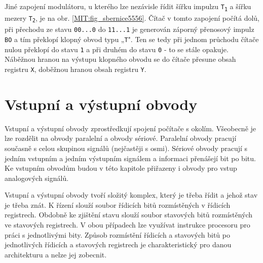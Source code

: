     Jiné zapojení modulátoru, u kterého lze nezávisle řídit šířku impulzu 
    \texttt{T\textsubscript{1}} a šířku mezery \texttt{T\textsubscript{2}}, je na obr. 
    \ref{MIT:fig_sbernice5556}. Čítač v tomto zapojení počítá dolů, při přechodu ze stavu 
    \texttt{00...0} do \texttt{11...1} je generován záporný přenosový impulz \texttt{BO} a tím 
    překlopí klopný obvod typu „\texttt{T}". Ten se tedy při jednom průchodu čítače nulou 
    překlopí do stavu \texttt{1} a při druhém do stavu \texttt{0} - to se stále opakuje. Náběžnou 
    hranou na výstupu klopného obvodu se do čítače přesune obsah registru \texttt{X}, doběžnou 
    hranou obsah registru \texttt{Y}.
        
  \section{Vstupní a výstupní obvody}\label{ces:IchapIVsecVIII}
    Vstupní a výstupní obvody zprostředkují spojení počítače s okolím. Všeobecně je lze rozdělit na 
    obvody paralelní a obvody sériové. Paralelní obvody pracují současně s celou skupinou signálů 
    (nejčastěji s osmi). Sériové obvody pracují s jedním vstupním a jedním výstupním signálem a 
    informaci přenášejí bit po bitu. Ke vstupním obvodům budou v této kapitole přiřazeny i obvody 
    pro vstup analogových signálů.
    
    Vstupní a výstupní obvody tvoří složitý komplex, který je třeba řídit a jehož stav je třeba 
    znát. K řízení slouží soubor řídicích bitů rozmístěných v řídicích registrech. Obdobně ke 
    zjištění stavu slouží soubor stavových bitů rozmístěných ve stavových registrech. V obou 
    případech lze využívat instrukce procesoru pro práci s jednotlivými bity. Způsob rozmístění 
    řídicích a stavových bitů po jednotlivých řídicích a stavových registrech je charakteristický 
    pro danou architekturu a nelze jej zobecnit.
    
